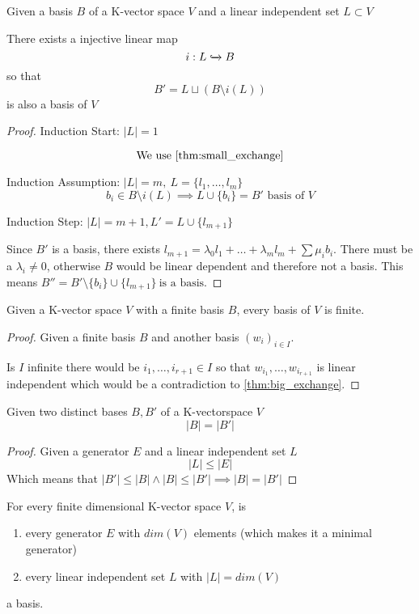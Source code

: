 \begin{theorem}\label{thm:big_exchange}
   Given a basis \(B\) of a K-vector space \(V\) and a linear independent set \(L \subset V\)

   There exists a injective linear map
   \[i: L \xhookrightarrow{} B\]
   so that
   \[B' = L \sqcup (B \setminus i(L))\]
   is also a basis of \(V\)
\end{theorem}
\begin{proof}

   Induction Start: \(|L| = 1\)

   \[\text{We use \cref{thm:small_exchange}}\]

   Induction Assumption: \(|L| = m,~L = \{l_1, \ldots, l_m\}\)
   \[b_i \in B \setminus i(L) \implies L \cup \{b_i\} = B' \text{ basis of } V\]

   Induction Step: \(|L| = m + 1, L' = L \cup \{l_{m+1}\}\)

   Since \(B'\) is a basis, there exists \(l_{m+1} = \lambda_0 l_1 + \ldots + \lambda_m l_m + \sum \mu_i b_i\).
   There must be a \(\lambda_i \neq 0\), otherwise \(B\) would be linear dependent and therefore not a basis.
   This means \(B'' = B' \setminus \{b_i\} \cup \{l_{m+1}\}~\text{is a basis.}\)
\end{proof}

\begin{corollary}
   Given a K-vector space \(V\) with a finite basis \(B\), every basis of \(V\) is finite.
\end{corollary}
\begin{proof} %
   Given a finite basis \(B\) and another basis \((w_i)_{i \in I}\).

   Is \(I\) infinite there would be \(i_1, \ldots, i_{r+1} \in I\) so that \(w_{i_1}, \ldots, w_{i_{r+1}}\) is linear independent which would be a contradiction to \cref{thm:big_exchange}.
\end{proof}

\begin{corollary}[\(|B| = |B'|\)]
   Given two distinct bases \(B, B'\) of a K-vectorspace \(V\)
   \[|B| = |B'|\]
\end{corollary}
\begin{proof}
   Given a generator \(E\) and a linear independent set \(L\)
   \[|L| \leq |E|\]
   Which means that \(|B'| \leq |B| \land |B| \leq |B'| \implies |B| = |B'|\)
\end{proof}
\begin{remark}
   For every finite dimensional K-vector space \(V\), is
   \begin{enumerate}
      \item every generator \(E\) with \(dim(V)\) elements (which makes it a minimal generator)
      \item every linear independent set \(L\) with \(|L| = dim(V)\)
   \end{enumerate}
   a basis.
\end{remark}


